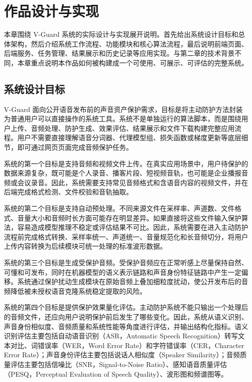 \chapter{作品设计与实现}\label{ux7b2cux4e09ux7ae0-ux4f5cux54c1ux8bbeux8ba1ux4e0eux5b9eux73b0}

本章围绕 V-Guard
系统的实际设计与实现展开说明。首先给出系统设计目标和总体架构，然后介绍系统工作流程、功能模块和核心算法流程，最后说明前端页面、后端服务、任务管理、结果展示和历史记录等应用实现。与第二章的技术背景不同，本章重点说明本作品如何被构建成一个可使用、可展示、可评估的完整系统。

\section{系统设计目标}\label{ux7cfbux7edfux8bbeux8ba1ux76eeux6807}

V-Guard
面向公开语音发布前的声音资产保护需求，目标是将主动防护方法封装为普通用户可以直接操作的系统工具。系统不是单独运行的算法脚本，而是围绕用户上传、音频处理、防护生成、效果评估、结果展示和文件下载构建完整应用流程。用户不需要直接理解语音分词器、代理模型组、损失函数或梯度更新等底层细节，即可通过网页页面完成音频保护任务。

系统的第一个目标是支持音频和视频文件上传。在真实应用场景中，用户待保护的数据来源复杂，既可能是个人录音、播客片段、短视频音轨，也可能是企业播报音频或会议录音。因此，系统需要支持常见音频格式和含语音内容的视频文件，并在后端完成格式检测、文件校验和音轨抽取。

系统的第二个目标是支持自动预处理。不同来源文件在采样率、声道数、文件格式、音量大小和音频时长方面可能存在明显差异。如果直接将这些文件输入保护算法，容易造成模型推理不稳定或评估结果不可比。因此，系统需要在进入主动防护流程前完成格式转换、采样率统一、声道统一、音量规范化和长音频切分，将用户上传内容转换为后续模块可统一处理的标准波形数据。

系统的第三个目标是生成受保护音频。受保护音频应在正常听感上尽量保持自然、可懂和可发布，同时在机器模型的语义表示链路和声音身份特征链路中产生一定偏移。系统通过保护扰动生成模块在原始音频上叠加细粒度扰动，使公开发布后的音频降低被未授权语音克隆系统稳定提取的风险。

系统的第四个目标是提供保护效果量化评估。主动防护系统不能只输出一个处理后的音频文件，还应向用户说明保护前后发生了哪些变化。因此，系统从语义识别、声音身份相似度、音频质量和系统性能等角度进行评估，并输出结构化指标。语义识别评估主要包括自动语音识别（ASR，Automatic
Speech Recognition）转写文本对比、词错误率（WER，Word Error
Rate）和字符错误率（CER，Character Error
Rate）；声音身份评估主要包括说话人相似度（Speaker
Similarity）；音频质量评估主要包括信噪比（SNR，Signal-to-Noise
Ratio）、感知语音质量评估（PESQ，Perceptual Evaluation of Speech
Quality）、波形图和频谱图等。

